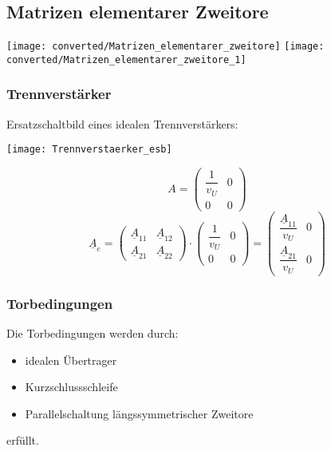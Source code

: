 \begin{samepage}
    \onecolumn
    \subsection{Matrizen elementarer Zweitore}
    \texttt{[image: converted/Matrizen\_elementarer\_zweitore]}
    \texttt{[image: converted/Matrizen\_elementarer\_zweitore\_1]}
\end{samepage}
\twocolumn

\subsubsection{Trennverst\"arker}
\begin{mdframed}[style=exercise]
Ersatzschaltbild eines idealen Trennverst\"arkers:
    \begin{center}
        \texttt{[image: Trennverstaerker\_esb]}
    \end{center}
    \[
        A = \begin{pmatrix}
            \dfrac{1}{v_U} & 0 \\
                  0        & 0
        \end{pmatrix}
    \]
    \[
        \underline{A}_e = \begin{pmatrix}
            \underline{A}_{11} & \underline{A}_{12}\\
            \underline{A}_{21} & \underline{A}_{22}
        \end{pmatrix}
        \cdot
        \begin{pmatrix}
            \dfrac{1}{v_U} & 0 \\
                  0        & 0
        \end{pmatrix}
        = \begin{pmatrix}
            \dfrac{\underline{A}_{11}}{v_U} & 0\\
            \dfrac{\underline{A}_{21}}{v_U} & 0
        \end{pmatrix}
    \]
\end{mdframed}

\subsubsection{Torbedingungen}
Die Torbedingungen werden durch:
    \begin{itemize}
        \item idealen \"Ubertrager
        \item Kurzschlussschleife
        \item Parallelschaltung längssymmetrischer Zweitore
    \end{itemize} erf\"ullt.


